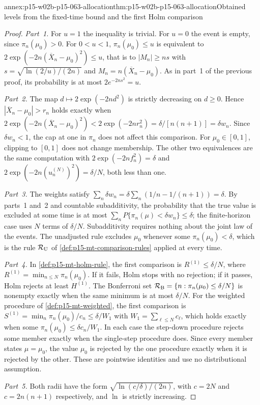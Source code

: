 \begin{annexitem}{annex:p15-w02b-p15-063-allocation}{thm:p15-w02b-p15-063-allocation}{Obtained levels from the fixed-time bound and the first Holm comparison}
\begin{proof}
\emph{Part~1.} For \(u=1\) the inequality is trivial. For \(u=0\) the
event is empty, since \(\pi_n(\mu_0)>0\). For \(0<u<1\), \(\pi_n(\mu_0)\leq u\) is equivalent to
\(2\exp(-2n(\overline X_n-\mu_0)^2)\leq u\), that is to
\(|M_n|\geq ns\) with \(s=\sqrt{\ln(2/u)/(2n)}\) and
\(M_n=n(\overline X_n-\mu_0)\). As in part~1 of the previous proof, its
probability is at most \(2e^{-2ns^2}=u\).

\emph{Part~2.} The map \(d\mapsto2\exp(-2nd^2)\) is strictly decreasing
on \(d\geq0\). Hence \(|\overline X_n-\mu_0|>r_n\) holds exactly when
\(2\exp(-2n(\overline X_n-\mu_0)^2)<2\exp(-2nr_n^2)=\delta/[n(n+1)]=
\delta w_n\). Since \(\delta w_n<1\), the cap at one in \(\pi_n\) does not
affect this comparison. For \(\mu_0\in[0,1]\), clipping to \([0,1]\) does
not change membership. The other two equivalences are the same
computation with \(2\exp(-2nf_n^2)=\delta\) and
\(2\exp(-2n(u^{(N)}_n)^2)=\delta/N\), both less than one.

\emph{Part~3.} The weights satisfy
\(\sum_n\delta w_n=\delta\sum_n(1/n-1/(n+1))=\delta\). By parts~1
and~2 and countable subadditivity, the probability that the true value
is excluded at some time is at most \(\sum_nP\{\pi_n(\mu)<\delta w_n\}
\leq\delta\); the finite-horizon case uses \(N\) terms of \(\delta/N\).
Subadditivity requires nothing about the joint law of the events. The
unadjusted rule excludes \(\mu_0\) whenever some \(\pi_n(\mu_0)<\delta\),
which is the rule \(\mathcal R_{\rm U}\) of
\cref{def:p15-mt-comparison-rules} applied at every time.

\emph{Part~4.} In \cref{def:p15-mt-holm-rule}, the first comparison is
\(R^{(1)}\leq\delta/N\), where \(R^{(1)}=\min_{n\leq N}\pi_n(\mu_0)\). If
it fails, Holm stops with no rejection; if it passes, Holm rejects at
least \(H^{(1)}\). The Bonferroni set
\(\mathcal R_{\rm B}=\{n:\pi_n(\mu_0)\leq\delta/N\}\) is nonempty exactly
when the same minimum is at most \(\delta/N\). For the weighted procedure
of \cref{def:p15-mt-weighted}, the first comparison is
\(S^{(1)}=\min_n\pi_n(\mu_0)/c_n\leq\delta/W_1\) with
\(W_1=\sum_{\ell\leq N}c_\ell\), which holds exactly when some
\(\pi_n(\mu_0)\leq\delta c_n/W_1\). In each case the step-down procedure
rejects some member exactly when the single-step procedure does. Since
every member states \(\mu=\mu_0\), the value \(\mu_0\) is rejected by the
one procedure exactly when it is rejected by the other. These are
pointwise identities and use no distributional assumption.

\emph{Part~5.} Both radii have the form \(\sqrt{\ln(c/\delta)/(2n)}\), with
\(c=2N\) and \(c=2n(n+1)\) respectively, and \(\ln\) is strictly
increasing.
\end{proof}
\end{annexitem}

